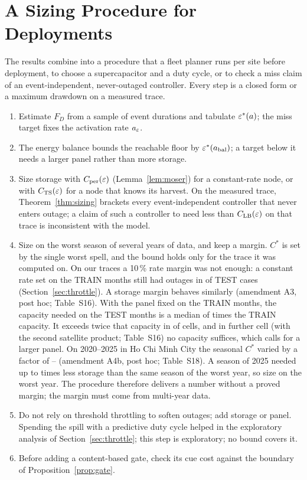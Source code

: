 \section{A Sizing Procedure for Deployments}\label{sec:procedure}
The results combine into a procedure that a fleet planner runs per site before deployment, to choose a supercapacitor and a duty cycle, or to check a miss claim of an event-independent, never-outaged controller. Every step is a closed form or a maximum drawdown on a measured trace.
\begin{enumerate}
\item Estimate $F_D$ from a sample of event durations and tabulate $\varepsilon^*(a)$; the miss target fixes the activation rate $a_\varepsilon$.
\item The energy balance bounds the reachable floor by $\varepsilon^*(a_{\mathrm{bal}})$; a target below it needs a larger panel rather than more storage.
\item Size storage with $C_{\mathrm{per}}(\varepsilon)$ (Lemma~\ref{lem:moser}) for a constant-rate node, or with $C_{\mathrm{TS}}(\varepsilon)$ for a node that knows its harvest. On the measured trace, Theorem~\ref{thm:sizing} brackets every event-independent controller that never enters outage; a claim of such a controller to need less than $C_{\mathrm{LB}}(\varepsilon)$ on that trace is inconsistent with the model.
\item Size on the worst season of several years of data, and keep a margin. $C^*$ is set by the single worst spell, and the bound holds only for the trace it was computed on. On our traces a 10\,\% rate margin was not enough: a constant rate set on the TRAIN months still had outages in \ExThreeOutTen{} of TEST cases (Section~\ref{sec:throttle}). A storage margin behaves similarly (amendment A3, post hoc; Table~S16). With the panel fixed on the TRAIN months, the capacity needed on the TEST months is a median of \KMedS{} times the TRAIN capacity. It exceeds twice that capacity in \KGtTwoS{} of \nCellsSS{} cells, and in \KInfS{} further cell (with the second satellite product; Table~S16) no capacity suffices, which calls for a larger panel. On 2020--2025 in Ho Chi Minh City the seasonal $C^*$ varied by a factor of \AivbLo--\AivbHi{} (amendment A4b, post hoc; Table~S18). A season of 2025 needed up to \AivbOverFive{} times less storage than the same season of the worst year, so size on the worst year. The procedure therefore delivers a number without a proved margin; the margin must come from multi-year data.
\item Do not rely on threshold throttling to soften outages; add storage or panel. Spending the spill with a predictive duty cycle helped in the exploratory analysis of Section~\ref{sec:throttle}; this step is exploratory; no bound covers it.
\item Before adding a content-based gate, check its cue cost against the boundary of Proposition~\ref{prop:gate}.
\end{enumerate}
